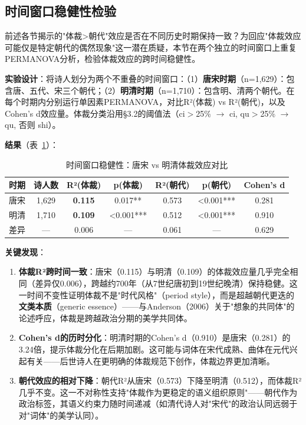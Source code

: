 
\subsection{时间窗口稳健性检验}
\label{sec:time-window}

前述各节揭示的"体裁>朝代"效应是否在不同历史时期保持一致？为回应"体裁效应可能仅是特定朝代的偶然现象"这一潜在质疑，本节在两个独立的时间窗口上重复PERMANOVA分析，检验体裁效应的跨时间稳健性。

\textbf{实验设计}：将诗人划分为两个不重叠的时间窗口：（1）\textbf{唐宋时期}（n=1,629）：包含唐、五代、宋三个朝代；（2）\textbf{明清时期}（n=1,710）：包含明、清两个朝代。在每个时期内分别运行单因素PERMANOVA，对比R²(体裁) vs R²(朝代)，以及Cohen's d效应量。体裁分类沿用§3.2的阈值法（ci$>$25\% $\to$ ci, qu$>$25\% $\to$ qu, 否则 shi）。

\textbf{结果}（表~\ref{tab:time-window}）：

\begin{table}[htbp]
  \centering
  \caption{时间窗口稳健性：唐宋 vs 明清体裁效应对比}
  \label{tab:time-window}
  \begin{tabular}{lcccccc}
    \toprule
    时期 & 诗人数 & R²(体裁) & p(体裁) & R²(朝代) & p(朝代) & Cohen's d \\
    \midrule
    唐宋 & 1,629 & \textbf{0.115} & 0.017** & 0.573 & <0.001*** & 0.281 \\
    明清 & 1,710 & \textbf{0.109} & <0.001*** & 0.512 & <0.001*** & 0.910 \\
    \midrule
    差异 & --- & 0.006 & --- & 0.061 & --- & 0.629 \\
    \bottomrule
  \end{tabular}
\end{table}

\textbf{关键发现}：
\begin{enumerate}
  \item \textbf{体裁R²跨时间一致}：唐宋（0.115）与明清（0.109）的体裁效应量几乎完全相同（差异仅0.006），跨越约700年（从7世纪唐初到19世纪晚清）保持稳健。这一时间不变性证明体裁不是"时代风格"（period style），而是超越朝代更迭的\textbf{文类本质}（generic essence）——与Anderson（2006）关于"想象的共同体"的论述呼应，体裁是跨越政治分期的美学共同体。
  \item \textbf{Cohen's d的历时分化}：明清时期的Cohen's d（0.910）是唐宋（0.281）的3.24倍，提示体裁分化在后期加剧。这可能与词体在宋代成熟、曲体在元代兴起有关——后世诗人在更明确的体裁规范下创作，体裁边界更加清晰。
  \item \textbf{朝代效应的相对下降}：朝代R²从唐宋（0.573）下降至明清（0.512），而体裁R²几乎不变。这一不对称性支持"体裁作为更稳定的语义组织原则"——朝代作为政治标签，其语义约束力随时间递减（如清代诗人对"宋代"的政治认同远弱于对"词体"的美学认同）。
\end{enumerate}

